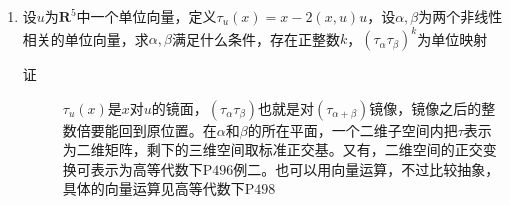 \begin{enumerate}
\item 设$u$为$\mathbf{R}^5$中一个单位向量，定义$\tau_u(x) = x - 2(x,u)u$，设$\alpha,\beta$为两个非线性相关的单位向量，求$\alpha,\beta$满足什么条件，存在正整数$k$，$(\tau_\alpha\tau_\beta)^k$为单位映射
\begin{description}
\item[证] $\tau_u(x)$是$x$对$u$的镜面，$(\tau_\alpha\tau_\beta)$也就是对$(\tau_{\alpha+\beta})$镜像，镜像之后的整数倍要能回到原位置。在$\alpha$和$\beta$的所在平面，一个二维子空间内把$\tau$表示为二维矩阵，剩下的三维空间取标准正交基。又有，二维空间的正交变换可表示为高等代数下P$496$例二。也可以用向量运算，不过比较抽象，具体的向量运算见高等代数下P$498$
\end{description}
\end{enumerate}